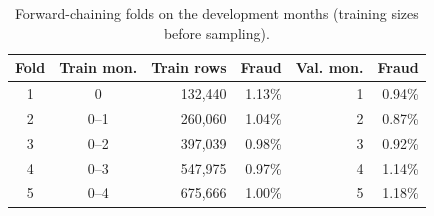 \begin{table}[!t]
\centering
\caption{Forward-chaining folds on the development months (training sizes before sampling).}
\label{tab:folds}
\footnotesize
\setlength{\tabcolsep}{3.5pt}
\begin{tabular}{ccrrrr}
\hline
Fold & Train mon. & Train rows & Fraud & Val. mon. & Fraud \\
\hline
1 & 0 & 132,440 & 1.13\% & 1 & 0.94\% \\
2 & 0--1 & 260,060 & 1.04\% & 2 & 0.87\% \\
3 & 0--2 & 397,039 & 0.98\% & 3 & 0.92\% \\
4 & 0--3 & 547,975 & 0.97\% & 4 & 1.14\% \\
5 & 0--4 & 675,666 & 1.00\% & 5 & 1.18\% \\
\hline
\end{tabular}
\end{table}
